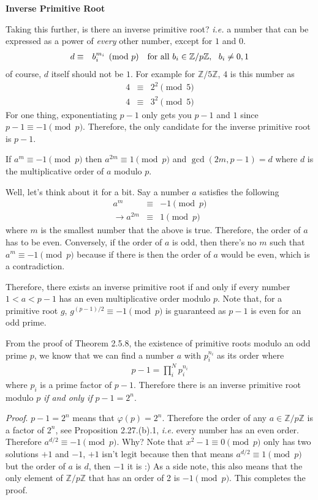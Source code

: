 \documentclass[aps,preprint,preprintnumbers,nofootinbib,showpacs,prd]{revtex4-1}
\newcommand{\ie}{{\it i.e.} }
\newcommand{\nbea}{\begin{eqnarray*}}
\newcommand{\neea}{\end{eqnarray*}}
\begin{document}
\bigskip
{\bf Inverse Primitive Root}

Taking this further, is there an inverse primitive root? \ie a number that can be expressed as a power of {\it every} other number, except for $1$ and $0$. 
%
\nbea
d & \equiv & b_i^{m_i} \pmod{p}~~~{\rm for~all~} b_i \in \mathbb{Z}/p\mathbb{Z}, ~~b_i \neq 0,1
\neea
%
of course, $d$ itself should not be $1$. For example for $\mathbb{Z}/5\mathbb{Z}$, $4$ is this number as
%
\nbea
4 & \equiv & 2^2 \pmod{5} \\
4 & \equiv & 3^2 \pmod{5}
\neea
%
For one thing, exponentiating $p-1$ only gets you $p-1$ and $1$ since $p-1 \equiv -1 \pmod{p}$. Therefore, the only candidate for the inverse primitive root is $p-1$.

If $a^m \equiv -1 \pmod{p}$ then $a^{2m} \equiv 1 \pmod{p}$ and $\gcd(2m, p-1) = d$ where $d$ is the multiplicative order of $a$ modulo $p$. 

Well, let's think about it for a bit. Say a number $a$ satisfies the following
%
\nbea
a^m & \equiv & -1 \pmod{p} \\
\to a^{2m} & \equiv & 1 \pmod{p}
\neea
%
where $m$ is the smallest number that the above is true. Therefore, the order of $a$ has to be even. Conversely, if the order of $a$ is odd, then there's no $m$ such that $a^m \equiv -1 \pmod{p}$ because if there is then the order of $a$ would be even, which is a contradiction.

Therefore, there exists an inverse primitive root if and only if every number $1 < a < p-1$ has an even multiplicative order modulo $p$. Note that, for a primitive root $g$, $g^{(p-1)/2} \equiv -1 \pmod{p}$ is guaranteed as $p-1$ is even for an odd prime.

From the proof of Theorem 2.5.8, the existence of primitive roots modulo an odd prime $p$, we know that we can find a number $a$ with $p_i^{n_i}$ as its order where
%
\nbea
p-1 = \prod_i^{N} p_i^{n_i}
\neea
%
where $p_i$ is a prime factor of $p-1$. Therefore there is an inverse primitive root modulo $p$ {\it if and only if} $p-1 = 2^n$.

{\it Proof}. $p-1 = 2^n$ means that $\varphi(p) = 2^n$. Therefore the order of any $a \in \mathbb{Z}/p\mathbb{Z}$ is a factor of $2^n$, see Proposition 2.27.(b).1, \ie every number has an even order.  Therefore $a^{d/2} \equiv -1 \pmod{p}$. Why? Note that $x^2 - 1 \equiv 0 \pmod{p}$ only has two solutions $+1$ and $-1$, $+1$ isn't legit because then that means $a^{d/2} \equiv 1 \pmod{p}$ but the order of $a$ is $d$, then $-1$ it is :) As a side note, this also means that the only element of $\mathbb{Z}/p\mathbb{Z}$ that has an order of 2 is $-1 \pmod{p}$. This completes the proof.
\end{document}

